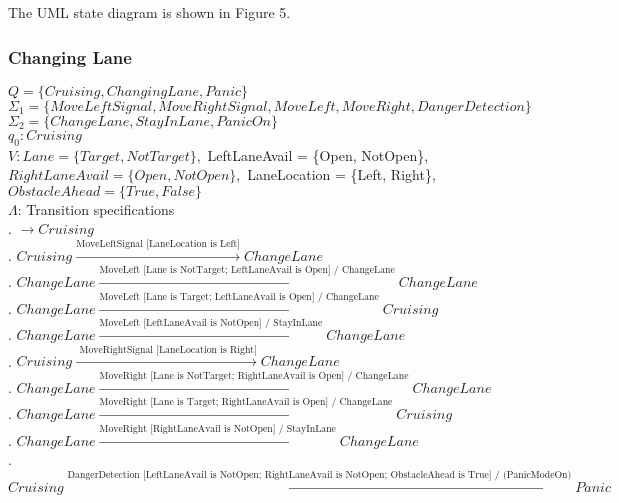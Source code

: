 \documentclass[12pt]{article}
\begin{document}
\begin{spacing}{1.5}
\noindent The UML state diagram is shown in Figure 5.

\newpage
\subsubsection{Changing Lane}

\noindent $Q = \{Cruising, ChangingLane, Panic\}$\\
\noindent $\Sigma_1 = \{MoveLeftSignal, MoveRightSignal, MoveLeft, MoveRight, DangerDetection\}$\\
\noindent $\Sigma_2 = \{ChangeLane, StayInLane, PanicOn\}$\\
\noindent $q_0: Cruising$\\
\noindent $V: Lane = \{Target, NotTarget\}, $ LeftLaneAvail  = \{Open, NotOpen\}, $ RightLaneAvail  = \{Open, NotOpen\}, $ LaneLocation  = \{Left, Right\}, $ ObstacleAhead  = \{True, False\}$\\
\noindent $\Lambda$: Transition specifications\\

. $\rightarrow Cruising$\\
. $Cruising \xrightarrow {\text {MoveLeftSignal [LaneLocation is Left]}} ChangeLane$\\
. $ChangeLane \xrightarrow {\text {MoveLeft [Lane is NotTarget; LeftLaneAvail is Open] / ChangeLane}} ChangeLane$\\
. $ChangeLane \xrightarrow {\text {MoveLeft [Lane is Target; LeftLaneAvail is Open] / ChangeLane}} Cruising$\\
. $ChangeLane \xrightarrow {\text {MoveLeft [LeftLaneAvail  is NotOpen] / StayInLane}} ChangeLane$\\
. $Cruising \xrightarrow {\text { MoveRightSignal [LaneLocation is Right]}} ChangeLane$\\
. $ChangeLane \xrightarrow {\text {MoveRight [Lane is NotTarget; RightLaneAvail is Open] / ChangeLane}} ChangeLane$\\
. $ChangeLane \xrightarrow {\text {MoveRight [Lane is Target; RightLaneAvail is Open] / ChangeLane}} Cruising$\\
. $ChangeLane \xrightarrow {\text {MoveRight [RightLaneAvail is NotOpen] / StayInLane}} ChangeLane$\\
. $Cruising \xrightarrow {\text {DangerDetection [LeftLaneAvail is NotOpen; RightLaneAvail is NotOpen; ObstacleAhead is True] / (PanicModeOn)}} Panic$\\


\end{spacing}
\end{document}
